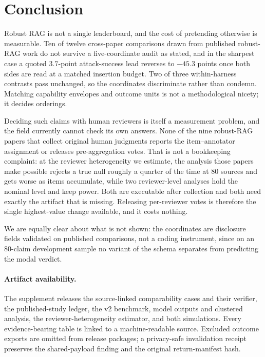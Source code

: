 \documentclass[11pt]{article}
\begin{document}
\section{Conclusion}

Robust RAG is not a single leaderboard, and the cost of pretending otherwise is
measurable. Ten of twelve cross-paper comparisons drawn from published
robust-RAG work do not survive a five-coordinate audit as stated, and in the
sharpest case a quoted $3.7$-point attack-success lead reverses to $-45.3$
points once both sides are read at a matched insertion budget. Two of three
within-harness contrasts pass unchanged, so the coordinates discriminate
rather than condemn. Matching capability envelopes and outcome units is not a
methodological nicety; it decides orderings.

Deciding such claims with human reviewers is itself a measurement problem, and
the field currently cannot check its own answers. None of the nine robust-RAG
papers that collect original human judgments reports the item--annotator
assignment or releases pre-aggregation votes. That is not a bookkeeping
complaint: at the reviewer heterogeneity we estimate, the analysis those
papers make possible rejects a true null roughly a quarter of the time at 80
sources and gets worse as items accumulate, while two reviewer-level analyses
hold the nominal level and keep power. Both are executable after collection
and both need exactly the artifact that is missing. Releasing per-reviewer
votes is therefore the single highest-value change available, and it costs
nothing.

We are equally clear about what is not shown: the coordinates are disclosure
fields validated on published comparisons, not a coding instrument, since on an
80-claim development sample no variant of the schema separates from predicting
the modal verdict.

\paragraph{Artifact availability.}
The supplement releases the source-linked comparability cases and their
verifier, the published-study ledger, the v2 benchmark, model outputs and
clustered analysis, the reviewer-heterogeneity estimator, and both
simulations. Every evidence-bearing table is linked to a machine-readable
source. Excluded outcome exports are omitted from release packages; a
privacy-safe invalidation receipt preserves the shared-payload finding and the
original return-manifest hash.
\end{document}
